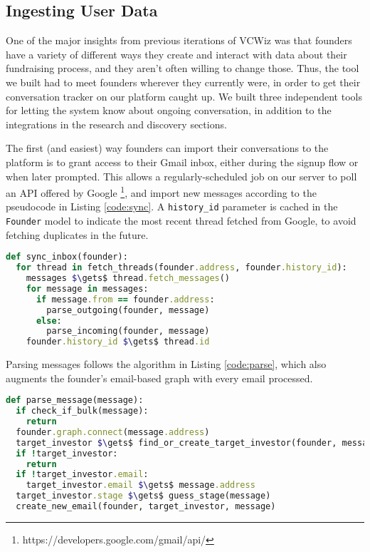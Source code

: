 \subsection{Ingesting User Data}
\label{vcwiz:ingesting}

One of the major insights from previous iterations of VCWiz was that founders have a variety of different ways they create and interact with data about their fundraising process, and they aren't often willing to change those. Thus, the tool we built had to meet founders wherever they currently were, in order to get their conversation tracker on our platform caught up. We built three independent tools for letting the system know about ongoing conversation, in addition to the integrations in the research and discovery sections.

The first (and easiest) way founders can import their conversations to the platform is to grant access to their Gmail inbox, either during the signup flow or when later prompted. This allows a regularly-scheduled job on our server to poll an API offered by Google \footnote{https://developers.google.com/gmail/api/}, and import new messages according to the pseudocode in Listing \ref{code:sync}. A \texttt{history\_id} parameter is cached in the \texttt{Founder} model to indicate the most recent thread fetched from Google, to avoid fetching duplicates in the future.

\begin{lstlisting}[float,frame=single,mathescape=true,language=Ruby,basicstyle=\footnotesize,columns=fullflexible,caption={Sync Inbox},label={code:sync}]
def sync_inbox(founder):
  for thread in fetch_threads(founder.address, founder.history_id):
    messages $\gets$ thread.fetch_messages()
    for message in messages:
      if message.from == founder.address:
        parse_outgoing(founder, message)
      else:
        parse_incoming(founder, message)
    founder.history_id $\gets$ thread.id
\end{lstlisting}

Parsing messages follows the algorithm in Listing \ref{code:parse}, which also augments the founder's email-based graph with every email processed.

\begin{lstlisting}[float,frame=single,mathescape=true,language=Ruby,basicstyle=\footnotesize,columns=fullflexible,caption={Parse Message},label={code:parse}]
def parse_message(message):
  if check_if_bulk(message):
    return
  founder.graph.connect(message.address)
  target_investor $\gets$ find_or_create_target_investor(founder, message)
  if !target_investor:
    return
  if !target_investor.email:
    target_investor.email $\gets$ message.address
  target_investor.stage $\gets$ guess_stage(message)
  create_new_email(founder, target_investor, message)
\end{lstlisting}

